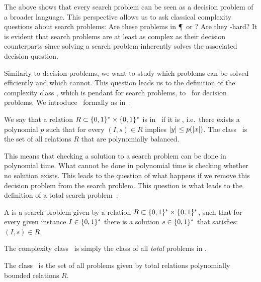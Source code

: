The above shows that every search problem can be seen as a decision problem of a broader language. This perspective allows us to ask classical complexity questions about search problems: Are these problems in \P\ or \NP? Are they \NP-hard? It is evident that search problems are at least as complex as their decision counterparts since solving a search problem inherently solves the associated decision question.

Similarly to decision problems, we want to study which problems can be solved efficiently and which cannot. This question leads us to the definition of the complexity class \FNP, which is pendant for search problems, to  \NP\ for decision problems. We introduce \FNP\ formally as in~.

\begin{definition}
	We say that a relation $R\subset \{0, 1\}^* \times \{0, 1\}^*$ is in \FNP\ if it is , i.e.\ there exists a polynomial $p$ such that for every $(I, s) \in R$ implies $\left\lvert y\right\rvert \leq p(\left\lvert x\right\rvert)$.
	The class \FNP\ is the set of all relations $R$ that are polynomially balanced.
\end{definition}

This means that checking a solution to a search problem can be done in polynomial time. What cannot be done in polynomial time is checking whether no solution exists. This leads to the question of what happens if we remove this decision problem from the search problem. This question is what leads to the definition of a total search problem~\cite{megiddo_total_1991}:

\begin{definition}
	A  is a search problem given by a relation $R\subset \{0, 1\}^* \times \{0, 1\}^*$, such that for every given instance $I\in
		\{0, 1\}^*$ there is a solution $s \in \{0, 1\}^*$ that satisfies: $(I, s) \in R$.
\end{definition}

The complexity class \TFNP\ is simply the class of all \emph{total} problems in \FNP.

\begin{definition}
	The class \TFNP\ is the set of all problems given by total relations polynomially bounded relations $R$.
\end{definition}

